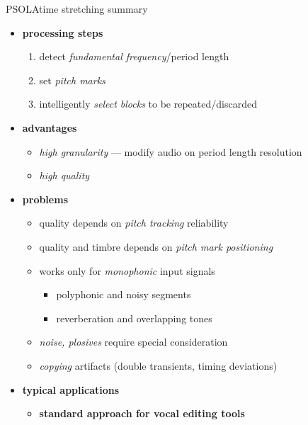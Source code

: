     \begin{frame}{PSOLA}{time stretching summary}
        \vspace{-3mm}
        \begin{itemize}
            \item   \textbf{processing steps}
                \begin{enumerate}
                    \item   detect \textit{fundamental frequency}/period length
                    \item   set \textit{pitch marks}
                    \item   intelligently \textit{select blocks} to be repeated/discarded
                \end{enumerate}
            \pause
            \item   \textbf{advantages}
                \begin{itemize}
                    \item   \textit{high granularity} --- modify audio on period length resolution
                    \item   \textit{high quality}
                \end{itemize}
            \pause
            \item   \textbf{problems}
                \begin{itemize}
                    \item   quality depends on \textit{pitch tracking} reliability
                    \item   quality and timbre depends on \textit{pitch mark positioning}
                    \item   works only for \textit{monophonic} input signals
                        \begin{itemize}
                            \item   polyphonic and noisy segments
                            \item reverberation and overlapping tones
                        \end{itemize}
                   \item    \textit{noise, plosives} require special consideration
                   \item    \textit{copying} artifacts (double transients, timing deviations)
                \end{itemize}
            \pause
            \item   \textbf{typical applications}
                \begin{itemize}
                    \item   \textbf{standard approach for vocal editing tools}
                \end{itemize}
        \end{itemize}
    \end{frame}

